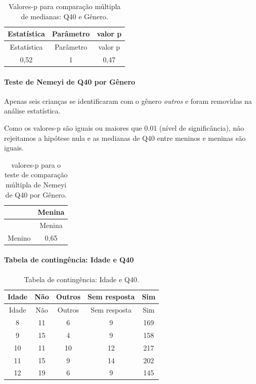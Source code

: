 \documentclass[]{article}
\let\oldparagraph\paragraph
\renewcommand{\paragraph}[1]{\oldparagraph{#1}\mbox{}}
\begin{document}
\begin{longtable}[]{@{}ccc@{}}
\caption{\label{tab:unnamed-chunk-1563}Valores-p para comparação múltipla de medianas: Q40 e Gênero.}\tabularnewline
\toprule
Estatística & Parâmetro & valor p\tabularnewline
\midrule
\endfirsthead
\toprule
Estatística & Parâmetro & valor p\tabularnewline
\midrule
\endhead
0,52 & 1 & 0,47\tabularnewline
\bottomrule
\end{longtable}

\hypertarget{teste-de-nemeyi-de-q40-por-guxeanero}{%
\paragraph{Teste de Nemeyi de Q40 por Gênero}\label{teste-de-nemeyi-de-q40-por-guxeanero}}

Apenas seis crianças se identificaram com o gênero \emph{outros} e foram removidas na análise estatística.

Como os valores-p são iguais ou maiores que 0.01 (nível de significância), não rejeitamos a hipótese nula e as medianas de Q40 entre meninos e meninas são iguais.

\begin{longtable}[]{@{}lc@{}}
\caption{\label{tab:unnamed-chunk-1565}valores-p para o teste de comparação múltipla de Nemeyi de Q40 por Gênero.}\tabularnewline
\toprule
& Menina\tabularnewline
\midrule
\endfirsthead
\toprule
& Menina\tabularnewline
\midrule
\endhead
Menino & 0,65\tabularnewline
\bottomrule
\end{longtable}

\cleardoublepage

\hypertarget{tabela-de-continguxeancia-idade-e-q40}{%
\paragraph{Tabela de contingência: Idade e Q40}\label{tabela-de-continguxeancia-idade-e-q40}}

\begin{longtable}[]{@{}ccccc@{}}
\caption{\label{tab:unnamed-chunk-1566}Tabela de contingência: Idade e Q40.}\tabularnewline
\toprule
Idade & Não & Outros & Sem resposta & Sim\tabularnewline
\midrule
\endfirsthead
\toprule
Idade & Não & Outros & Sem resposta & Sim\tabularnewline
\midrule
\endhead
8 & 11 & 6 & 9 & 169\tabularnewline
9 & 15 & 4 & 9 & 158\tabularnewline
10 & 11 & 10 & 12 & 217\tabularnewline
11 & 15 & 9 & 14 & 202\tabularnewline
12 & 19 & 6 & 9 & 145\tabularnewline
\bottomrule
\end{longtable}
\end{document}

